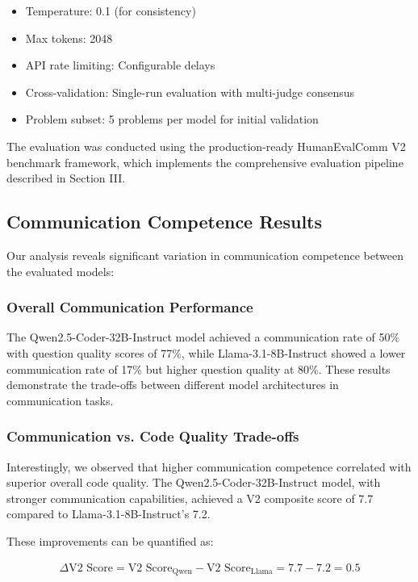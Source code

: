 \documentclass[conference]{IEEEtran}
\begin{document}
\begin{itemize}
    \item Temperature: 0.1 (for consistency)
    \item Max tokens: 2048
    \item API rate limiting: Configurable delays
    \item Cross-validation: Single-run evaluation with multi-judge consensus
    \item Problem subset: 5 problems per model for initial validation
\end{itemize}

The evaluation was conducted using the production-ready HumanEvalComm V2 benchmark framework, which implements the comprehensive evaluation pipeline described in Section III.

\subsection{Communication Competence Results}

Our analysis reveals significant variation in communication competence between the evaluated models:

\subsubsection{Overall Communication Performance}

The Qwen2.5-Coder-32B-Instruct model achieved a communication rate of 50\% with question quality scores of 77\%, while Llama-3.1-8B-Instruct showed a lower communication rate of 17\% but higher question quality at 80\%. These results demonstrate the trade-offs between different model architectures in communication tasks.

\subsubsection{Communication vs. Code Quality Trade-offs}

Interestingly, we observed that higher communication competence correlated with superior overall code quality. The Qwen2.5-Coder-32B-Instruct model, with stronger communication capabilities, achieved a V2 composite score of 7.7 compared to Llama-3.1-8B-Instruct's 7.2.

These improvements can be quantified as:

\begin{align}
\Delta \text{V2 Score} = \text{V2 Score}_{\text{Qwen}} - \text{V2 Score}_{\text{Llama}} = 7.7 - 7.2 = 0.5
\end{align}
\end{document}
